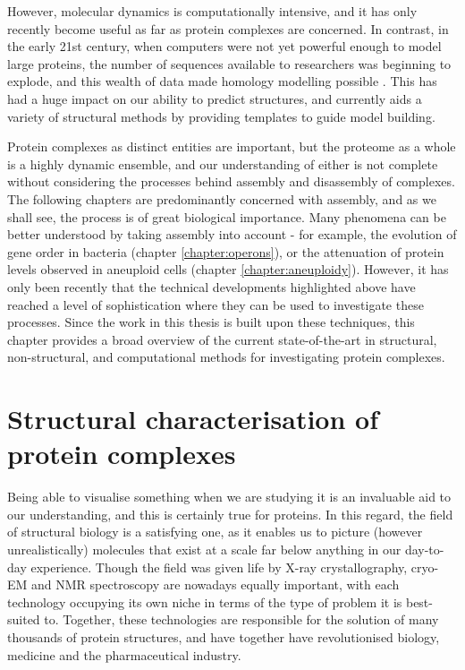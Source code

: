 \documentclass[a4paper,11pt,twoside,openright]{scrbook}
\begin{document}
However, molecular dynamics is computationally intensive, and it has only
recently become useful as far as protein complexes are concerned. In contrast,
in the early 21st century, when computers were not yet powerful enough to model
large proteins, the number of sequences available to researchers was beginning
to explode, and this wealth of data made homology modelling possible
\cite{Rost1996,Xu1998}. This has had a huge impact on our ability to predict
structures, and currently aids a variety of structural methods by providing
templates to guide model building.

Protein complexes as distinct entities are important, but the proteome as a
whole is a highly dynamic ensemble, and our understanding of either is not
complete without considering the processes behind assembly and disassembly of
complexes. The following chapters are predominantly concerned with assembly, and
as we shall see, the process is of great biological importance. Many phenomena
can be better understood by taking assembly into account - for example, the
evolution of gene order in bacteria (chapter \ref{chapter:operons}), or the
attenuation of protein levels observed in aneuploid cells (chapter
\ref{chapter:aneuploidy}). However, it has only been recently that the technical
developments highlighted above have reached a level of sophistication where they
can be used to investigate these processes. Since the work in this thesis is
built upon these techniques, this chapter provides a broad overview of the
current state-of-the-art in structural, non-structural, and computational
methods for investigating protein complexes.

\section{Structural characterisation of protein complexes}
Being able to visualise something when we are studying it is an invaluable aid
to our understanding, and this is certainly true for proteins. In this regard,
the field of structural biology is a satisfying one, as it enables us to picture
(however unrealistically) molecules that exist at a scale far below anything in
our day-to-day experience. Though the field was given life by X-ray
crystallography, cryo-EM and NMR spectroscopy are nowadays equally important,
with each technology occupying its own niche in terms of the type of problem it
is best-suited to. Together, these technologies are responsible for the solution
of many thousands of protein structures, and have together have revolutionised
biology, medicine and the pharmaceutical industry.
\end{document}
